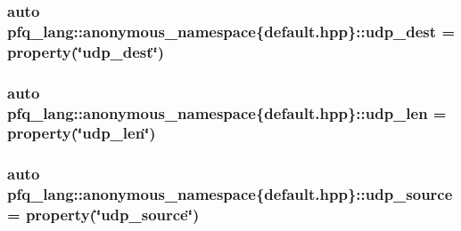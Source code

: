 \hypertarget{namespacepfq__lang_1_1anonymous__namespace_02default_8hpp_03_a4f869214bea58f5ed42b3faded5ab088}{
\subsubsection[{udp\+\_\+dest}]{\setlength{\rightskip}{0pt plus 5cm}auto pfq\+\_\+lang\+::anonymous\+\_\+namespace\{default.\+hpp\}\+::udp\+\_\+dest = {\bf property}(\char`\"{}udp\+\_\+dest\char`\"{})}}\label{namespacepfq__lang_1_1anonymous__namespace_02default_8hpp_03_a4f869214bea58f5ed42b3faded5ab088}
\hypertarget{namespacepfq__lang_1_1anonymous__namespace_02default_8hpp_03_ab0dcf23db0f218100e7fe51562e0add1}{
\subsubsection[{udp\+\_\+len}]{\setlength{\rightskip}{0pt plus 5cm}auto pfq\+\_\+lang\+::anonymous\+\_\+namespace\{default.\+hpp\}\+::udp\+\_\+len = {\bf property}(\char`\"{}udp\+\_\+len\char`\"{})}}\label{namespacepfq__lang_1_1anonymous__namespace_02default_8hpp_03_ab0dcf23db0f218100e7fe51562e0add1}
\hypertarget{namespacepfq__lang_1_1anonymous__namespace_02default_8hpp_03_a7d2943522cfb795fcb82c894dba83292}{
\subsubsection[{udp\+\_\+source}]{\setlength{\rightskip}{0pt plus 5cm}auto pfq\+\_\+lang\+::anonymous\+\_\+namespace\{default.\+hpp\}\+::udp\+\_\+source = {\bf property}(\char`\"{}udp\+\_\+source\char`\"{})}}\label{namespacepfq__lang_1_1anonymous__namespace_02default_8hpp_03_a7d2943522cfb795fcb82c894dba83292}
